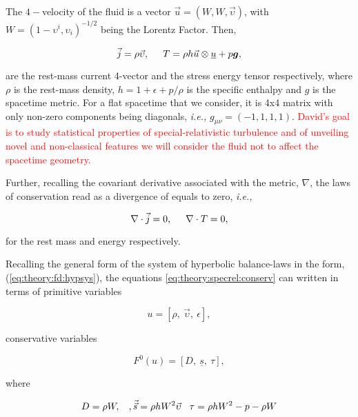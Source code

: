 \documentclass[11pt,a4paper,headinclude=true,DIV=14,BCOR=8mm,chapterprefix,listof=totoc,twoside,openright,abstracton]{scrbook}
\begin{document}
The $4-$velocity of the fluid is a vector $\vec{u} = (W, W, \vec{\upsilon})$, with $W = (1 - \upsilon^i , \upsilon_i)^{-1/2}$ being the Lorentz Factor. Then, 

\begin{equation}
    \vec{j} = \rho\vec{\upsilon}, \hspace{5mm} T = \rho h \vec{u} \otimes \underline{u} + p\boldsymbol{g},
\end{equation}

are the rest-mass current 4-vector and the stress energy tensor respectively, where $\rho$ is the rest-mass density, $h=1+\epsilon+p/\rho$ is the specific enthalpy and $g$ is the spacetime metric. For a flat spacetime that we consider, it is 4x4 matrix with only non-zero components being diagonals, \textit{i.e.,} $g_{\mu\nu}=(-1,1,1,1)$. \textcolor{red}{David's goal is to study statistical properties of special-relativistic turbulence and of unveiling novel and non-classical features we will consider the fluid not to affect the spacetime geometry.}

Further, recalling the covariant derivative associated with the metric, $\nabla$, the laws of conservation read as a divergence of equals to zero, \textit{i.e.,}

\begin{equation}
    \nabla\cdot\vec{j}=0,\hspace{5mm}\nabla\cdot T = 0,
    \label{eq:theory:specrel:conserv}
\end{equation}

for the rest mass and energy respectively. 

Recalling the general form of the system of hyperbolic balance-laws in the form, (\ref{eq:theory:fd:hypsys}), the equations \ref{eq:theory:specrel:conserv} can written in terms of primitive variables 

\begin{equation}
    u = [\rho, \: \vec{\upsilon}, \: \epsilon],
\end{equation}

conservative variables 

\begin{equation}
    F^0(u) = [D, \: \underline{s}, \: \tau],
\end{equation}

where 

\begin{equation}
    D = \rho W, \hspace{3mm}, \vec{\vec{s}} = \rho h W^2 \vec{\upsilon} \hspace{3mm} \tau = \rho h W^2 - p - \rho W
\end{equation}
\end{document}
